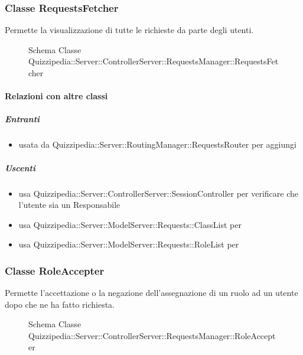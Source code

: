 \subsubsection{Classe RequestsFetcher}
Permette la visualizzazione di tutte le richieste da parte degli utenti.
\begin{figure}[H]
\centering
\noindent{}
\caption[Schema Classe RequestsFetcher]{Schema Classe Quizzipedia::Server::ControllerServer::RequestsManager::RequestsFetcher}
\end{figure}
\paragraph{Relazioni con altre classi}
\subparagraph{Entranti}
\begin{itemize}
\item usata da Quizzipedia::Server::RoutingManager::RequestsRouter per aggiungi
\end{itemize}
\subparagraph{Uscenti}
\begin{itemize}
\item usa Quizzipedia::Server::ControllerServer::SessionController per verificare che l'utente sia un Responsabile
\item usa Quizzipedia::Server::ModelServer::Requests::ClassList per 
\item usa Quizzipedia::Server::ModelServer::Requests::RoleList per 
\end{itemize}
\subsubsection{Classe RoleAccepter}
Permette l'accettazione o la negazione dell'assegnazione di un ruolo ad un utente dopo che ne ha fatto richiesta.
\begin{figure}[H]
\centering
\noindent{}
\caption[Schema Classe RoleAccepter]{Schema Classe Quizzipedia::Server::ControllerServer::RequestsManager::RoleAccepter}
\end{figure}
